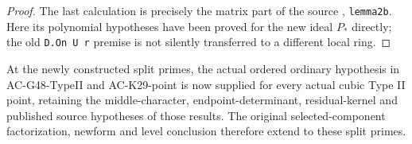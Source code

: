 \begin{proof}
The last calculation is precisely the matrix part
of the source
,
\texttt{lemma2b}.  Here its polynomial hypotheses
have been proved for the new ideal $P_*$ directly;
the old \texttt{D.On U r} premise is not silently
transferred to a different local ring.
\end{proof}

\begin{corollary}
\label{AC-G57-TypeII}
At the newly constructed split primes, the actual
ordered ordinary hypothesis in AC-G48-TypeII and
AC-K29-point is now supplied for every actual
cubic Type II point, retaining the middle-character,
endpoint-determinant, residual-kernel and published
source hypotheses of those results.
The original selected-component factorization,
newform and level conclusion therefore extend to
these split primes.
\end{corollary}
